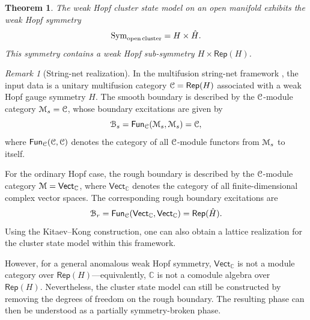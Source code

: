 \documentclass[a4paper,11pt]{article}
\theoremstyle{theorem}
\newtheorem{theorem}{Theorem}
\theoremstyle{remark}
\newtheorem{remark}{Remark}[section]
\newcommand\eB           {\EuScript{B}}
\newcommand\eC           {\EuScript{C}}
\newcommand\eM          {\EuScript{M}}
\newcommand\eS         {\EuScript{S}}
\newcommand{\Cbb}{\mathbb{C}}
\newcommand{\Rep}{\mathsf{Rep}}
\begin{document}
\begin{theorem}
    The weak Hopf cluster state model on an open manifold exhibits the weak Hopf symmetry
    \begin{equation}
        \operatorname{Sym}_{\rm open\, cluster} = H \times \hat{H}.
    \end{equation}
    This symmetry contains a weak Hopf sub-symmetry \( H \times \Rep(H) \).
\end{theorem}





\begin{remark}[String-net realization]
In the multifusion string-net framework \cite{Levin2005, Kitaev2012boundary, jia2024weakTube}, the input data is a unitary multifusion category $\eC = \Rep(H)$ associated with a weak Hopf gauge symmetry $H$. The smooth boundary is described by the $\eC$-module category $\eM_s = \eC$, whose boundary excitations are given by 
\[
\eB_s = \mathsf{Fun}_{\eC}(\eM_s, \eM_s) = \eC,
\]
where $\mathsf{Fun}_{\eC}(\eC, \eC)$ denotes the category of all $\eC$-module functors from $\eM_s$ to itself.  

For the ordinary Hopf case, the rough boundary is described by the $\eC$-module category $\eM = \mathsf{Vect}_{\Cbb}$, where $\mathsf{Vect}_{\Cbb}$ denotes the category of all finite-dimensional complex vector spaces. The corresponding rough boundary excitations are
\[
\eB_r = \mathsf{Fun}_{\eC}(\mathsf{Vect}_{\Cbb}, \mathsf{Vect}_{\Cbb}) = \Rep(\hat{H}).
\]
Using the Kitaev–Kong construction, one can also obtain a lattice realization for the cluster state model within this framework.  

However, for a general anomalous weak Hopf symmetry, $\mathsf{Vect}_{\Cbb}$ is not a module category over $\Rep(H)$—equivalently, $\Cbb$ is not a comodule algebra over $\Rep(H)$. Nevertheless, the cluster state model can still be constructed by removing the degrees of freedom on the rough boundary. The resulting phase can then be understood as a partially symmetry-broken phase.
\end{remark}



\end{document}
